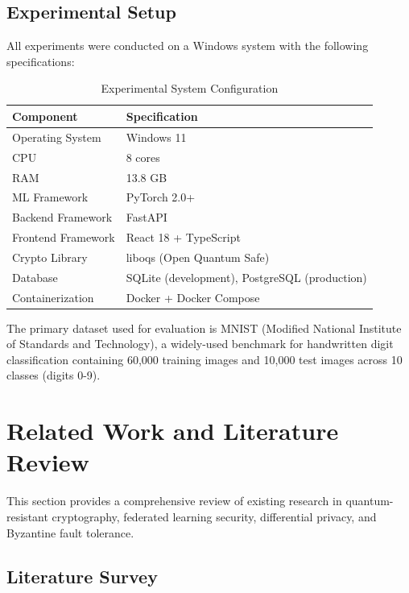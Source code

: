 \documentclass[12pt,a4paper]{article}
\begin{document}
\subsection{Experimental Setup}

All experiments were conducted on a Windows system with the following specifications:

\begin{table}[H]
\centering
\caption{Experimental System Configuration}
\label{tab:system_config}
\begin{tabular}{ll}
\toprule
\textbf{Component} & \textbf{Specification} \\
\midrule
Operating System & Windows 11 \\
CPU & 8 cores \\
RAM & 13.8 GB \\
ML Framework & PyTorch 2.0+ \\
Backend Framework & FastAPI \\
Frontend Framework & React 18 + TypeScript \\
Crypto Library & liboqs (Open Quantum Safe) \\
Database & SQLite (development), PostgreSQL (production) \\
Containerization & Docker + Docker Compose \\
\bottomrule
\end{tabular}
\end{table}

The primary dataset used for evaluation is MNIST (Modified National Institute of Standards and Technology), a widely-used benchmark for handwritten digit classification containing 60,000 training images and 10,000 test images across 10 classes (digits 0-9).

\section{Related Work and Literature Review}

This section provides a comprehensive review of existing research in quantum-resistant cryptography, federated learning security, differential privacy, and Byzantine fault tolerance.

\subsection{Literature Survey}
\end{document}
